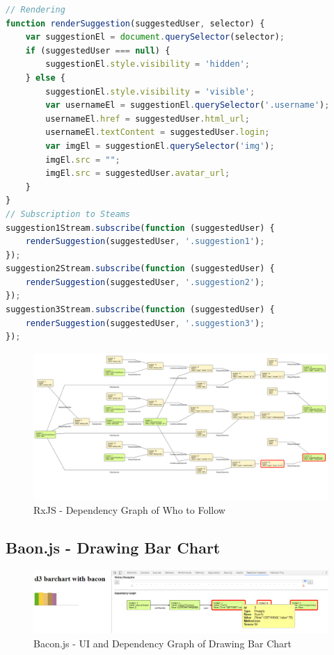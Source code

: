 \begin{lstlisting}[language=JavaScript, caption=RxJS - Who to Follow, label={lst:evaluation-who_to_follow}]
// Rendering
function renderSuggestion(suggestedUser, selector) {
	var suggestionEl = document.querySelector(selector);
	if (suggestedUser === null) {
		suggestionEl.style.visibility = 'hidden';
	} else {
		suggestionEl.style.visibility = 'visible';
		var usernameEl = suggestionEl.querySelector('.username');
		usernameEl.href = suggestedUser.html_url;
		usernameEl.textContent = suggestedUser.login;
		var imgEl = suggestionEl.querySelector('img');
		imgEl.src = "";
		imgEl.src = suggestedUser.avatar_url;
	}
}
// Subscription to Steams
suggestion1Stream.subscribe(function (suggestedUser) {
	renderSuggestion(suggestedUser, '.suggestion1');
});
suggestion2Stream.subscribe(function (suggestedUser) {
	renderSuggestion(suggestedUser, '.suggestion2');
});
suggestion3Stream.subscribe(function (suggestedUser) {
	renderSuggestion(suggestedUser, '.suggestion3');
});	
\end{lstlisting}

\begin{figure}
	\includegraphics[width=\textwidth]{gfx/evaluation/who_to_follow_dgraph.png}
	\caption{RxJS - Dependency Graph of Who to Follow}
	\label{fig:who_to_follow_dgraph}
\end{figure}





\subsection{Baon.js - Drawing Bar Chart}

\begin{figure}[!h]
	\centering
	\includegraphics[width=\textwidth,height=\textheight,keepaspectratio]{gfx/evaluation/bar_chart_ui_n_dgraph.png}
	\caption{Bacon.js - UI and Dependency Graph of Drawing Bar Chart}
	\label{fig:bar_chart_ui_n_dgraph}
\end{figure}

